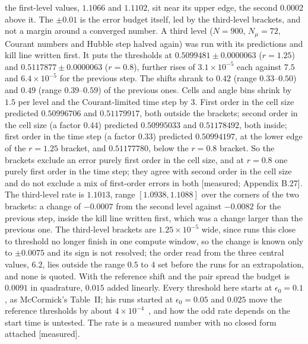 \documentclass[11pt]{article}
\newcommand{\grade}[1]{\textsf{\small[#1]}}
\begin{document}
the first-level values, $1.1066$ and $1.1102$, sit near its upper edge, the second $0.0002$ above it. The $\pm0.01$ is the error budget itself, led by the third-level brackets, and not a margin around a converged number. A third level ($N=900$, $N_\mu=72$, Courant numbers and Hubble step halved again) was run with its predictions and kill line written first. It puts the thresholds at $0.5099481\pm0.0000063$ ($r=1.25$) and $0.5117877\pm0.0000063$ ($r=0.8$), further rises of $3.1\times10^{-5}$ each against $7.5$ and $6.4\times10^{-5}$ for the previous step. The shifts shrank to $0.42$ (range $0.33$--$0.50$) and $0.49$ (range $0.39$--$0.59$) of the previous ones. Cells and angle bins shrink by $1.5$ per level and the Courant-limited time step by $3$. First order in the cell size predicted $0.50996706$ and $0.51179917$, both outside the brackets; second order in the cell size (a factor $0.44$) predicted $0.50995033$ and $0.51178492$, both inside; first order in the time step (a factor $0.33$) predicted $0.50994197$, at the lower edge of the $r=1.25$ bracket, and $0.51177780$, below the $r=0.8$ bracket. So the brackets exclude an error purely first order in the cell size, and at $r=0.8$ one purely first order in the time step; they agree with second order in the cell size and do not exclude a mix of first-order errors in both \grade{measured; Appendix B.27}. The third-level rate is $1.1013$, range $[1.0938,1.1088]$ over the corners of the two brackets: a change of $-0.0007$ from the second level against $-0.0082$ for the previous step, inside the kill line written first, which was a change larger than the previous one. The third-level brackets are $1.25\times10^{-5}$ wide, since runs this close to threshold no longer finish in one compute window, so the change is known only to $\pm0.0075$ and its sign is not resolved; the order read from the three central values, $6.2$, lies outside the range $0.5$ to $4$ set before the runs for an extrapolation, and none is quoted. With the reference shift and the pair spread the budget is $0.0091$ in quadrature, $0.015$ added linearly. Every threshold here starts at $\epsilon_0=0.1$, as McCormick's Table~II; his runs started at $\epsilon_0=0.05$ and $0.025$ move the reference thresholds by about $4\times10^{-4}$~\cite{McCcode}, and how the odd rate depends on the start time is untested. The rate is a measured number with no closed form attached \grade{measured}.
\end{document}
